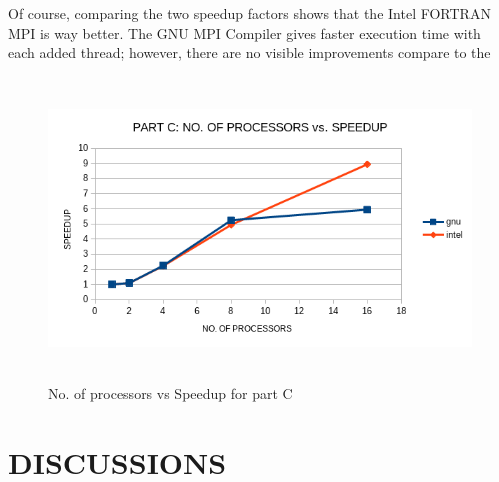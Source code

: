 \documentclass[12pt]{article}
\begin{document}
    \noindent
    Of course, comparing the two speedup factors shows that the Intel FORTRAN MPI is way better. The GNU MPI Compiler gives faster execution time with each added thread; however, there are no visible improvements compare to the 


    \begin{figure}[H]
        \hfill\includegraphics[width=150mm,height= 80mm]{partC_COMBINE.png}\hspace*{\fill}
        \caption{No. of processors vs Speedup for part C}
    \end{figure}
    \fi

   \newpage
   \section{DISCUSSIONS}
\end{document}
